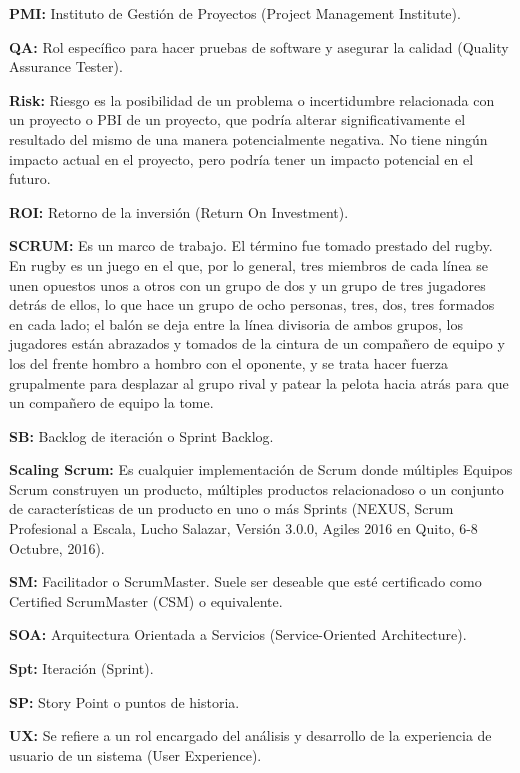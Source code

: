 \begin{description}
  \item {\textbf{PMI:} Instituto de Gestión de Proyectos (Project Management Institute).}
  
  \item {\textbf{QA:} Rol específico para hacer pruebas de software y asegurar la calidad (Quality Assurance Tester).}
  
  \item {\textbf{Risk:} Riesgo es la posibilidad de un problema o incertidumbre relacionada con un proyecto o PBI de un proyecto, que podría alterar significativamente el resultado del mismo de una manera potencialmente negativa. No tiene ningún impacto actual en el proyecto, pero podría tener un impacto potencial en el futuro.}
  
  \item {\textbf{ROI:} Retorno de la inversión (Return On Investment).}
  
  \item {\textbf{SCRUM:} Es un marco de trabajo. El término fue tomado prestado del rugby. En rugby es un juego en el que, por lo general, tres miembros de cada línea se unen opuestos unos a otros con un grupo de dos y un grupo de tres jugadores detrás de ellos, lo que hace un grupo de ocho personas, tres, dos, tres formados en cada lado; el balón se deja entre la línea divisoria de ambos grupos, los jugadores están abrazados y tomados de la cintura de un compañero de equipo y los del frente hombro a hombro con el oponente, y se trata hacer fuerza grupalmente para desplazar al grupo rival y patear la pelota hacia atrás para que un compañero de equipo la tome.}
  
  \item {\textbf{SB:} Backlog de iteración o Sprint Backlog.}
  
  \item {\textbf{Scaling Scrum:} Es cualquier implementación de Scrum donde múltiples Equipos Scrum construyen un producto, múltiples productos relacionadoso o un conjunto de características de un producto en uno o más Sprints (NEXUS, Scrum Profesional a Escala, Lucho Salazar, Versión 3.0.0,  Agiles 2016 en Quito, 6-8 Octubre, 2016).}
  
  \item {\textbf{SM:} Facilitador o ScrumMaster. Suele ser deseable que esté certificado como Certified ScrumMaster (CSM) o equivalente. }
  
  \item {\textbf{SOA:} Arquitectura Orientada a Servicios (Service-Oriented Architecture).}
  
  \item {\textbf{Spt:} Iteración (Sprint).}
  
  \item {\textbf{SP:} Story Point o puntos de historia.}
  
  \item {\textbf{UX:} Se refiere a un rol encargado del análisis y desarrollo de la experiencia de usuario de un sistema (User Experience).}
  
\end{description}
  
